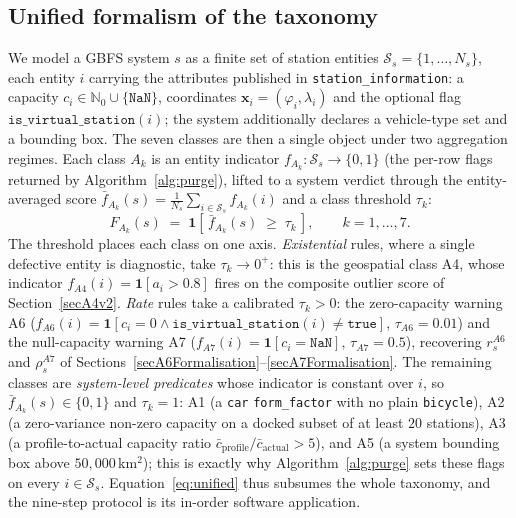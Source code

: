 \documentclass[11pt,a4paper]{article}
\begin{document}
\subsection{Unified formalism of the taxonomy}\label{secUnifiedFormalism}
We model a GBFS system $s$ as a finite set of station entities
$\mathcal{S}_s = \{1,\dots,N_s\}$, each entity $i$ carrying the attributes
published in \texttt{station\_information}: a capacity
$c_i \in \mathbb{N}_0 \cup \{\mathtt{NaN}\}$, coordinates
$\mathbf{x}_i = (\varphi_i,\lambda_i)$ and the optional flag
$\mathtt{is\_virtual\_station}(i)$; the system additionally declares a
vehicle-type set and a bounding box. The seven classes are then a single
object under two aggregation regimes. Each class $A_k$ is an entity
indicator $f_{A_k}:\mathcal{S}_s\to\{0,1\}$ (the per-row flags returned by
Algorithm~\ref{alg:purge}), lifted to a system verdict through the
entity-averaged score $\bar f_{A_k}(s)=\tfrac{1}{N_s}\sum_{i\in\mathcal{S}_s}f_{A_k}(i)$ and a class threshold $\tau_k$:
\begin{equation}
F_{A_k}(s)\;=\;\mathbf{1}\!\left[\,\bar f_{A_k}(s)\;\geq\;\tau_k\,\right],
\qquad k=1,\dots,7.
\label{eq:unified}
\end{equation}
The threshold places each class on one axis. \emph{Existential} rules,
where a single defective entity is diagnostic, take $\tau_k\to 0^{+}$: this
is the geospatial class A4, whose indicator
$f_{A4}(i)=\mathbf{1}[a_i>0.8]$ fires on the composite outlier score of
Section~\ref{secA4v2}. \emph{Rate} rules take a calibrated $\tau_k>0$: the
zero-capacity warning A6 ($f_{A6}(i)=\mathbf{1}[c_i=0\land\mathtt{is\_virtual\_station}(i)\neq\mathtt{true}]$, $\tau_{A6}=0.01$) and the null-capacity
warning A7 ($f_{A7}(i)=\mathbf{1}[c_i=\mathtt{NaN}]$, $\tau_{A7}=0.5$),
recovering $r_s^{A6}$ and $\rho_s^{A7}$ of
Sections~\ref{secA6Formalisation}--\ref{secA7Formalisation}. The remaining
classes are \emph{system-level predicates} whose indicator is constant over
$i$, so $\bar f_{A_k}(s)\in\{0,1\}$ and $\tau_k=1$: A1 (a \texttt{car}
\texttt{form\_factor} with no plain \texttt{bicycle}), A2 (a zero-variance
non-zero capacity on a docked subset of at least $20$ stations), A3
(a profile-to-actual capacity ratio $\bar c_{\text{profile}}/\bar c_{\text{actual}}>5$), and A5 (a system bounding box above
$50{,}000$\,km$^2$); this is exactly why Algorithm~\ref{alg:purge} sets
these flags on every $i\in\mathcal{S}_s$. Equation~\eqref{eq:unified} thus
subsumes the whole taxonomy, and the nine-step protocol is its in-order
software application.
\end{document}

